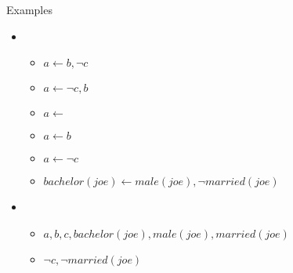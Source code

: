 \begin{frame}{Examples}
  \begin{itemize}\normalsize
  \item<1-> 
    \begin{itemize}
    \item<1-> $a \leftarrow b, \neg c$
      \smallskip
    \item<1-> $a \leftarrow \neg c, b$
      \medskip
    \item<2-> $a \leftarrow          $
    \item<2-> $a \leftarrow b        $
    \item<2-> $a \leftarrow    \neg c$
      \medskip
    \item<3-> $\mathit{bachelor}(\mathit{joe}) \leftarrow \mathit{male}(\mathit{joe}), \neg \mathit{married}(\mathit{joe})$
    \end{itemize}
    \bigskip
  \item<4-> \normalsize
    \begin{itemize}
    \item<4-> $a,b,c,\mathit{bachelor}(\mathit{joe}), \mathit{male}(\mathit{joe}),\mathit{married}(\mathit{joe})$
      \smallskip
    \item<4-> $\neg c, \neg \mathit{married}(\mathit{joe})$
    \end{itemize}
  \end{itemize}
\end{frame}
%
